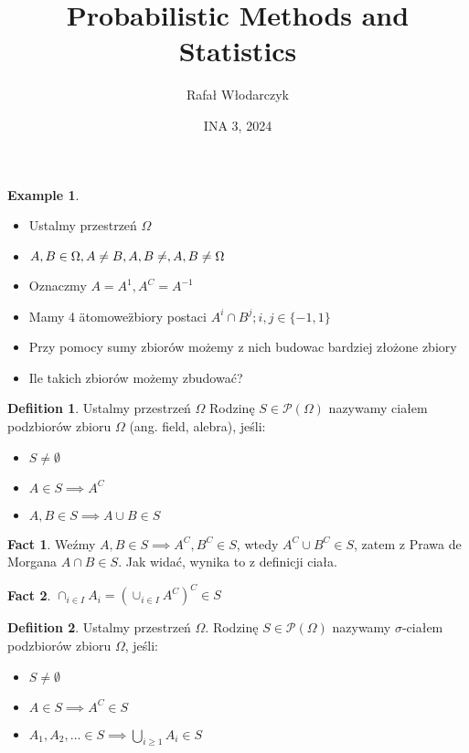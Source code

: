 \documentclass{article}
\title{Probabilistic Methods and Statistics}
\author{Rafał Włodarczyk}
\date{INA 3, 2024}
\theoremstyle{definition}
\newtheorem{de}{Defiition}[subsection]
\theoremstyle{definition}
\theoremstyle{definition}
\newtheorem{pk}{Example}[subsection]
\theoremstyle{definition}
\newtheorem{fakt}{Fact}
\begin{document}
\maketitle

\begin{pk}
    \begin{itemize}
        \item Ustalmy przestrzeń \(\Omega\)
        \item \(A,B\in \Omega, A\neq B, A,B\neq \empty, A,B\neq \Omega\)
        \item Oznaczmy \(A=A^1,A^C=A^{-1}\)
        \item Mamy 4 \"atomowe\" zbiory postaci \(A^i \cap B^j; i,j\in\{-1,1\}\)
        \item Przy pomocy sumy zbiorów możemy z nich budowac bardziej złożone zbiory
        \item Ile takich zbiorów możemy zbudować? 
    \end{itemize}
\end{pk}

\begin{de}
    Ustalmy przestrzeń \( \Omega \) Rodzinę \(S\in \mathcal{P}(\Omega)\) nazywamy ciałem podzbiorów zbioru \(\Omega\) (ang. field, alebra), jeśli:
    \begin{itemize}
        \item \(S\neq \emptyset\)
        \item \(A\in S \implies A^C\)
        \item \(A,B\in S \implies A\cup B \in S\)
    \end{itemize}

\end{de}

\begin{fakt}
    Weźmy \(A,B\in S \implies A^C,B^C\in S\), wtedy \(A^C\cup B^C\in S\), zatem z Prawa de Morgana \(A\cap B \in S\). Jak widać, wynika to z definicji ciała.
\end{fakt}

\begin{fakt}
    \(\cap_{i\in I} A_i = \left(\cup_{i\in I} A^C\right)^C\in S \)
\end{fakt}

\begin{de}
    Ustalmy przestrzeń \(\Omega\). Rodzinę \(S\in \mathcal{P}(\Omega)\) nazywamy $\sigma$-ciałem podzbiorów zbioru \(\Omega\), jeśli:
    \begin{itemize}
        \item \(S\neq \emptyset\)
        \item \(A\in S \implies A^C \in S\)
        \item \(A_1,A_2,\dots \in S \implies \bigcup_{i\geq 1} A_i \in S\)
    \end{itemize}
\end{de}
\end{document}
